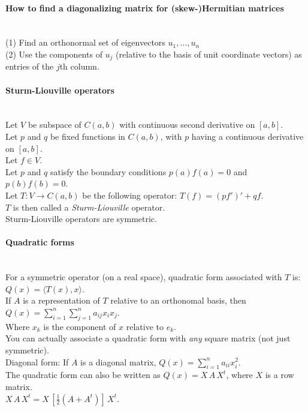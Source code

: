 \documentclass[10pt]{article}
\begin{document}
\paragraph{How to find a diagonalizing matrix for (skew-)Hermitian matrices}\ \\
(1) Find an orthonormal set of eigenvectors $u_1, \dotsc, u_n$\\
(2) Use the components of $u_j$ (relative to the basis of unit coordinate vectors) as entries of the $j$th column.

\paragraph{Sturm-Liouville operators}\ \\
Let $V$ be subspace of $C(a, b)$ with continuous second derivative on $[a, b]$.\\
Let $p$ and $q$ be fixed functions in $C(a, b)$, with $p$ having a continuous derivative on $[a, b]$.\\
Let $f \in V$.\\
Let $p$ and $q$ satisfy the boundary conditions $p(a)f(a) = 0$ and $p(b)f(b) = 0$.\\
Let $T: V \to C(a, b)$ be the following operator: $T(f) = (pf')' + qf$.\\
$T$ is then called a {\it Sturm-Liouville} operator.\\
Sturm-Liouville operators are symmetric.

\paragraph{Quadratic forms}\ \\
For a symmetric operator (on a real space), quadratic form associated with $T$ is: $Q(x) = \langle T(x), x \rangle$.\\
If $A$ is a representation of $T$ relative to an orthonomal basis, then $Q(x) = \sum_{i=1}^n \sum_{j=1}^n a_{ij}x_ix_j$.\\
Where $x_k$ is the component of $x$ relative to $e_k$.\\
You can actually associate a quadratic form with {\it any} square matrix (not just symmetric).\\
Diagonal form: If $A$ is a diagonal matrix, $Q(x) = \sum_{i=1}^n a_{ii} x_i^2$.\\
The quadratic form can also be written as $Q(x) = X\, A\, X^t$, where $X$ is a row matrix.\\
$X\, A\, X^t = X\, [\frac{1}{2} (A + A^t)]\, X^t$.
\end{document}
